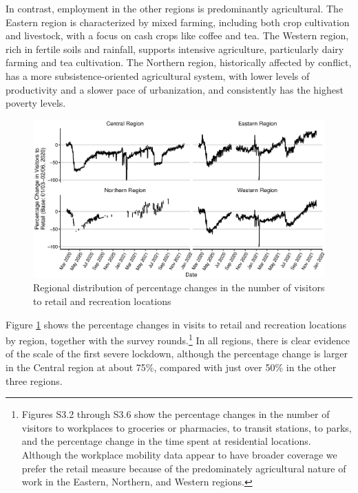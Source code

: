 \documentclass{wber}
\begin{document}
In contrast, employment in the other regions is predominantly
agricultural. The Eastern region is characterized by mixed farming,
including both crop cultivation and livestock, with a focus on cash
crops like coffee and tea. The Western region, rich in fertile soils and
rainfall, supports intensive agriculture, particularly dairy farming and
tea cultivation. The Northern region, historically affected by conflict,
has a more subsistence-oriented agricultural system, with lower levels
of productivity and a slower pace of urbanization, and consistently has
the highest poverty levels.

\begin{figure}
\caption{Regional distribution of percentage changes in the number of
visitors to retail and recreation locations}\label{fig:retail_regional}
\begin{center}
\includegraphics[width=\linewidth, keepaspectratio]{./eps/fig_05.eps}
\end{center}
\end{figure}

Figure \ref{fig:retail_regional} shows the percentage changes in visits to
retail and recreation locations by region, together with the survey
rounds.\footnote{Figures S3.2 through S3.6 show the
  percentage changes in the number of visitors to workplaces to
  groceries or pharmacies, to transit stations, to parks, and the
  percentage change in the time spent at residential locations. Although
  the workplace mobility data appear to have broader coverage we prefer
  the retail measure because of the predominately agricultural nature of
  work in the Eastern, Northern, and Western regions.} In all regions,
there is clear evidence of the scale of the first severe lockdown,
although the percentage change is larger in the Central region at about
75\%, compared with just over 50\% in the other three regions.
\end{document}
